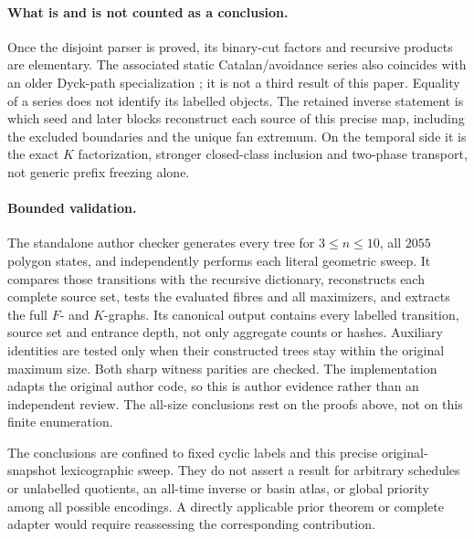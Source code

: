 \paragraph{What is and is not counted as a conclusion.}
Once the disjoint parser is proved, its binary-cut factors and recursive
products are elementary. The associated static Catalan/avoidance series
also coincides with an older Dyck-path specialization
\citep{mansour2006}; it is not a third result of this paper.
Equality of a series does not identify its labelled objects.
The retained inverse statement is which seed and later blocks reconstruct
each source of this precise map, including the excluded boundaries and
the unique fan extremum. On the temporal side it is the exact \(K\)
factorization, stronger closed-class inclusion and two-phase transport,
not generic prefix freezing alone.

\paragraph{Bounded validation.}
The standalone author checker generates every tree for \(3\le n\le10\),
all \(2055\) polygon states, and independently performs each literal
geometric sweep. It compares those transitions with the recursive
dictionary, reconstructs each complete source set, tests the evaluated
fibres and all maximizers, and extracts the full \(F\)- and \(K\)-graphs.
Its canonical output contains every labelled transition, source set and
entrance depth, not only aggregate counts or hashes. Auxiliary identities
are tested only when their constructed trees stay within the original
maximum size. Both sharp witness parities are checked. The implementation
adapts the original author code, so this is author evidence rather than
an independent review. The all-size conclusions rest on the proofs above,
not on this finite enumeration.

The conclusions are confined to fixed cyclic labels and this precise
original-snapshot lexicographic sweep. They do not assert a result for
arbitrary schedules or unlabelled quotients, an all-time inverse or basin
atlas, or global priority among all possible encodings. A directly
applicable prior theorem or complete adapter would require reassessing
the corresponding contribution.
